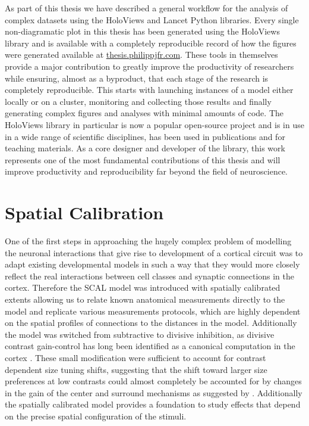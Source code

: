 As part of this thesis we have described a general workflow for the
analysis of complex datasets using the HoloViews and Lancet Python
libraries. Every single non-diagramatic plot in this thesis has been
generated using the HoloViews library and is available with a
completely reproducible record of how the figures were generated
available at \url{thesis.philippjfr.com}. These tools in themselves
provide a major contribution to greatly improve the productivity of
researchers while ensuring, almost as a byproduct, that each stage of
the research is completely reproducible. This starts with launching
instances of a model either locally or on a cluster, monitoring and
collecting those results and finally generating complex figures and
analyses with minimal amounts of code. The HoloViews library in
particular is now a popular open-source project and is in use in a
wide range of scientific disciplines, has been used in publications
and for teaching materials. As a core designer and developer of the
library, this work represents one of the most fundamental
contributions of this thesis and will improve productivity and
reproducibility far beyond the field of neuroscience.

\section{Spatial Calibration}

One of the first steps in approaching the hugely complex problem of
modelling the neuronal interactions that give rise to development of a
cortical circuit was to adapt existing developmental models in such a
way that they would more closely reflect the real interactions between
cell classes and synaptic connections in the cortex. Therefore the
SCAL model was introduced with spatially calibrated extents allowing
us to relate known anatomical measurements directly to the model and
replicate various measurements protocols, which are highly dependent
on the spatial profiles of connections to the distances in the
model. Additionally the model was switched from subtractive to
divisive inhibition, as divisive contrast gain-control has long been
identified as a canonical computation in the cortex
\citep{Carandini2012}. These small modification were sufficient to
account for contrast dependent size tuning shifts, suggesting that the
shift toward larger size preferences at low contrasts could almost
completely be accounted for by changes in the gain of the center and
surround mechanisms as suggested by \cite{Cavanaugh2002}. Additionally
the spatially calibrated model provides a foundation to study effects
that depend on the precise spatial configuration of the stimuli.

